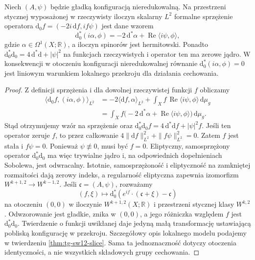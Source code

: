 \begin{lemat}
\label{lem:tg-sw-full-coulomb}
Niech $(A,\psi)$ będzie gładką konfiguracją nieredukowalną.
Na przestrzeni stycznej wyposażonej w rzeczywisty iloczyn
skalarny $L^2$ formalne sprzężenie operatora
$\mathrm d_0f=(-2i\,\mathrm df,if\psi)$ jest dane wzorem
\[
\mathrm d_0^*(i\alpha,\phi)
=-2\,\mathrm d^*\alpha
+\operatorname{Re}\langle i\psi,\phi\rangle,
\]
gdzie $\alpha\in\Omega^1(X;\mathbb R)$, a iloczyn
spinorów jest hermitowski. Ponadto
$\mathrm d_0^*\mathrm d_0=4\,\mathrm d^*\mathrm d+|\psi|^2$
na funkcjach rzeczywistych i operator ten ma zerowe jądro.
W konsekwencji w otoczeniu konfiguracji nieredukowalnej
równanie $\mathrm d_0^*(i\alpha,\phi)=0$ jest liniowym
warunkiem lokalnego przekroju dla działania cechowania.
\end{lemat}

\begin{proof}
Z definicji sprzężenia i dla dowolnej rzeczywistej funkcji
$f$ obliczamy
\[
\begin{aligned}
\langle \mathrm d_0f,(i\alpha,\phi)\rangle_{L^2}
&=-2\langle\mathrm df,\alpha\rangle_{L^2}
+\int_X f\,\operatorname{Re}\langle i\psi,\phi\rangle
\,\mathrm d\mu_g\\
&=\int_X f\bigl(-2\,\mathrm d^*\alpha
+\operatorname{Re}\langle i\psi,\phi\rangle\bigr)
\,\mathrm d\mu_g.
\end{aligned}
\]
Stąd otrzymujemy wzór na sprzężenie oraz
$\mathrm d_0^*\mathrm d_0f=4\,\mathrm d^*\mathrm df+|\psi|^2f$.
Jeśli ten operator zeruje $f$, to przez całkowanie
$4\|\mathrm df\|_{L^2}^2+\|f\psi\|_{L^2}^2=0$.
Zatem $f$ jest stała i $f\psi=0$. Ponieważ
$\psi\not\equiv0$, musi być $f=0$.
Eliptyczny, samosprzężony operator $\mathrm d_0^*\mathrm d_0$
ma więc trywialne jądro i, na odpowiednich dopełnieniach
Sobolewa, jest odwracalny. Istotnie, samosprzężoność i eliptyczność
na zamkniętej rozmaitości dają zerowy
indeks, a regularność eliptyczna zapewnia
izomorfizm $W^{k+1,2}\to W^{k-1,2}$.
Jeśli $\mathfrak c=(A,\psi)$, rozważamy
\[
(f,\xi)\longmapsto
\mathrm d_0^*(e^{if}\cdot(\mathfrak c+\xi)-\mathfrak c)
\]
na otoczeniu $(0,0)$ w iloczynie
$W^{k+1,2}(X;\mathbb R)$ i przestrzeni
stycznej klasy $W^{k,2}$.
Odwzorowanie jest gładkie, znika w $(0,0)$,
a jego różniczka względem $f$ jest
$\mathrm d_0^*\mathrm d_0$.
Twierdzenie o funkcji uwikłanej daje jedyną
małą transformację ustawiającą pobliską
konfigurację w przekroju. Szczegółowy opis
lokalnego modelu podajemy w twierdzeniu
\ref{thm:tg-sw12-slice}. Sama ta jednoznaczność
dotyczy otoczenia identyczności, a nie
wszystkich składowych grupy cechowania.
\end{proof}

